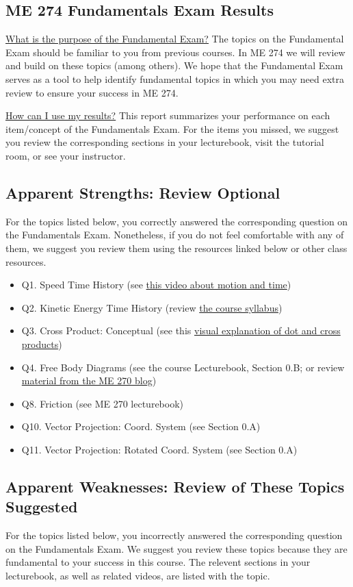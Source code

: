 \documentclass[11pt,letterpaper]{article}\usepackage[]{graphicx}\usepackage[]{color}
\begin{document}
\subsection*{ME 274 Fundamentals Exam Results}
\underline{What is the purpose of the Fundamental Exam?}  The topics on the Fundamental Exam should be familiar to you from previous courses.  In ME 274 we will review and build on these topics (among others). We hope that the Fundamental Exam serves as a tool to help identify fundamental topics in which you may need extra review to ensure your success in ME 274.\

\underline{How can I use my results?}  This report summarizes your performance on each item/concept of the Fundamentals Exam.  For the items you missed, we suggest you review the corresponding sections in your lecturebook, visit the tutorial room, or see your instructor.

\subsection*{Apparent Strengths: Review Optional}
For the topics listed below, you correctly answered the corresponding question on the Fundamentals Exam.  Nonetheless, if you do not feel comfortable with any of them, we suggest you review them using the resources linked below or other class resources.

\begin{itemize}\item Q1. Speed Time History (see \href{https://www.youtube.com/watch?v=lZPtFDXYQRU}{this video about motion and time})
\item Q2. Kinetic Energy Time History (review \href{https://www.purdue.edu/freeform/dynamics/wp-content/uploads/sites/4/2018/01/Syllabus-Spring-2018.pdf}{the course syllabus})
\item Q3. Cross Product: Conceptual (see this \href{https://www.youtube.com/watch?v=h0NJK4mEIJU&t=8s}{visual explanation of dot and cross products})
\item Q4. Free Body Diagrams (see the course Lecturebook, Section 0.B; or review \href{https://www.purdue.edu/statics/}{material from the ME 270 blog})
\item Q8. Friction (see ME 270 lecturebook)
\item Q10. Vector Projection: Coord. System (see Section 0.A)
\item Q11. Vector Projection: Rotated Coord. System (see Section 0.A)
\end{itemize}\subsection*{Apparent Weaknesses: Review of These Topics Suggested}
For the topics listed below, you incorrectly answered the corresponding question on the Fundamentals Exam.  We suggest you review these topics because they are fundamental to your success in this course.  The relevent sections in your lecturebook, as well as related videos, are listed with the topic.
\end{document}
